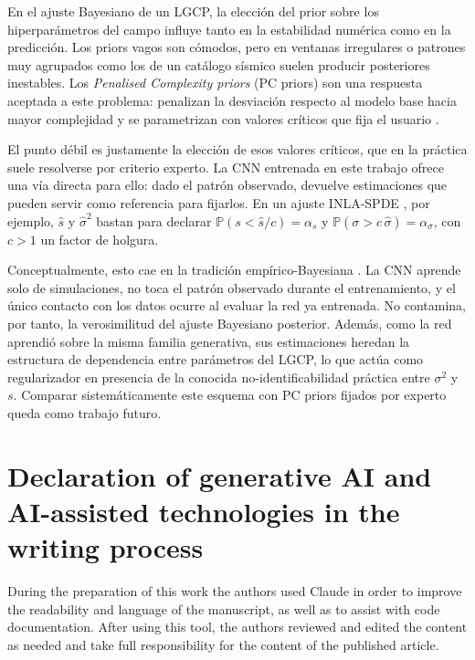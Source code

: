 \documentclass[a4paper,fleqn]{cas-sc}
\numberwithin{equation}{section}
\begin{document}
En el ajuste Bayesiano de un LGCP, la elecci\'on del prior sobre los
hiperpar\'ametros del campo influye tanto en la estabilidad num\'erica como
en la predicci\'on. Los priors vagos son c\'omodos, pero en ventanas
irregulares o patrones muy agrupados como los de un cat\'alogo s\'ismico
suelen producir posteriores inestables. Los \emph{Penalised Complexity
priors} (PC priors) son una respuesta aceptada a este problema: penalizan
la desviaci\'on respecto al modelo base hacia mayor complejidad y se
parametrizan con valores cr\'iticos que fija el usuario
\citep{simpson2017penalising, fuglstad2019constructing}.

El punto d\'ebil es justamente la elecci\'on de esos valores cr\'iticos,
que en la pr\'actica suele resolverse por criterio experto. La CNN
entrenada en este trabajo ofrece una v\'ia directa para ello: dado el
patr\'on observado, devuelve estimaciones que pueden servir como referencia
para fijarlos. En un ajuste INLA-SPDE \citep{Rue2009,toolboxINLA}, por
ejemplo, $\hat{s}$ y $\hat{\sigma}^2$ bastan para declarar
$\mathbb{P}(s<\hat{s}/c)=\alpha_s$ y $\mathbb{P}(\sigma>c\,\hat{\sigma})=\alpha_\sigma$, con $c>1$ un factor de
holgura.

Conceptualmente, esto cae en la tradici\'on emp\'irico-Bayesiana
\citep{CasellaEmpBayes}. La CNN aprende solo de simulaciones, no toca el
patr\'on observado durante el entrenamiento, y el \'unico contacto con los
datos ocurre al evaluar la red ya entrenada. No contamina, por tanto, la
verosimilitud del ajuste Bayesiano posterior. Adem\'as, como la red
aprendi\'o sobre la misma familia generativa, sus estimaciones heredan la
estructura de dependencia entre par\'ametros del LGCP, lo que act\'ua como
regularizador en presencia de la conocida no-identificabilidad pr\'actica
entre $\sigma^2$ y $s$. Comparar sistem\'aticamente este esquema con PC
priors fijados por experto queda como trabajo futuro.

\section*{Declaration of generative AI and AI-assisted technologies in the
writing process}

During the preparation of this work the authors used Claude
\citep{Anthropic2025} in order to improve the readability and language of the manuscript, as
well as to assist with code documentation. After using
this tool, the authors reviewed and edited the content as needed and take
full responsibility for the content of the published article.
\end{document}
